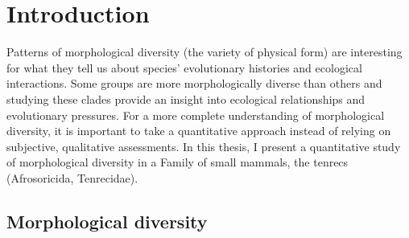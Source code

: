 \chapter{Introduction}
\label{chap:introduction}






	Patterns of morphological diversity (the variety of physical form) are interesting for what they tell us about species' evolutionary histories and ecological interactions. Some groups are more morphologically diverse than others and studying these clades provide an insight into ecological relationships and evolutionary pressures. For a more complete understanding of morphological diversity, it is important to take a quantitative approach instead of relying on subjective, qualitative assessments. 
	In this thesis, I present a quantitative study of morphological diversity in a Family of small mammals, the tenrecs (Afrosoricida, Tenrecidae).  

\noindent


\section{Morphological diversity}

